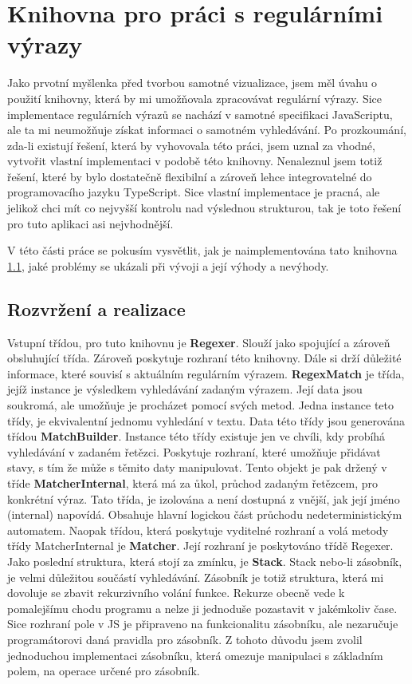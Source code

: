 \chapter{Knihovna pro práci s regulárními výrazy}\label{sec:Implementation1}

Jako prvotní myšlenka před tvorbou samotné vizualizace, jsem měl úvahu o použití knihovny, 
která by mi umožňovala zpracovávat regulární výrazy.
Sice implementace regulárních výrazů se nachází v samotné specifikaci JavaScriptu,
ale ta mi neumožňuje získat informaci o samotném vyhledávání.
Po prozkoumání, zda-li existují řešení, která by vyhovovala této práci, 
jsem uznal za vhodné, vytvořit vlastní implementaci v podobě této knihovny.
Nenaleznul jsem totiž řešení, které by bylo dostatečně flexibilní a 
zároveň lehce integrovatelné do programovacího jazyku TypeScript.
Sice vlastní implementace je pracná, ale jelikož chci mít co nejvyšší kontrolu nad výslednou strukturou, 
tak je toto řešení pro tuto aplikaci asi nejvhodnější. 

V této části práce se pokusím vysvětlit, jak je naimplementována tato knihovna \ref{sec:Imp1LayoutReal}, 
jaké problémy se ukázali při vývoji a její výhody a nevýhody. %

\section{Rozvržení a realizace}\label{sec:Imp1LayoutReal}

Vstupní třídou, pro tuto knihovnu je \textbf{Regexer}. 
Slouží jako spojující a zároveň obsluhující třída. 
Zároveň poskytuje rozhraní této knihovny.
Dále si drží důležité informace, které souvisí s aktuálním regulárním výrazem.
\textbf{RegexMatch} je třída, jejíž instance je výsledkem vyhledávání zadaným výrazem.
Její data jsou soukromá, ale umožňuje je procházet pomocí svých metod.
Jedna instance teto třídy, je ekvivalentní jednomu vyhledání v textu.
Data této třídy jsou generována třídou \textbf{MatchBuilder}.
Instance této třídy existuje jen ve chvíli, kdy probíhá vyhledávání v zadaném řetězci.
Poskytuje rozhraní, které umožňuje přidávat stavy, s tím že může s těmito daty manipulovat.
Tento objekt je pak držený v tříde \textbf{MatcherInternal}, 
která má za ůkol, průchod zadaným řetězcem, pro konkrétní výraz.
Tato třída, je izolována a není dostupná z vnější, jak její jméno (internal) napovídá.
Obsahuje hlavní logickou část průchodu nedeterministickým automatem.
Naopak třídou, která poskytuje vyditelné rozhraní a volá metody třídy MatcherInternal je \textbf{Matcher}.
Její rozhraní je poskytováno třídě Regexer.
Jako poslední struktura, která stojí za zmínku, je \textbf{Stack}.
Stack nebo-li zásobník, je velmi důležitou součástí vyhledávání.
Zásobník je totiž struktura, která mi dovoluje se zbavit rekurzivního volání funkce.
Rekurze obecně vede k pomalejšímu chodu programu a nelze ji jednoduše pozastavit v jakémkoliv čase.
Sice rozhraní pole v JS je připraveno na funkcionalitu zásobníku, 
ale nezaručuje programátorovi daná pravidla pro zásobník. 
Z tohoto důvodu jsem zvolil jednoduchou implementaci zásobníku, 
která omezuje manipulaci s základním polem, na operace určené pro zásobník.

